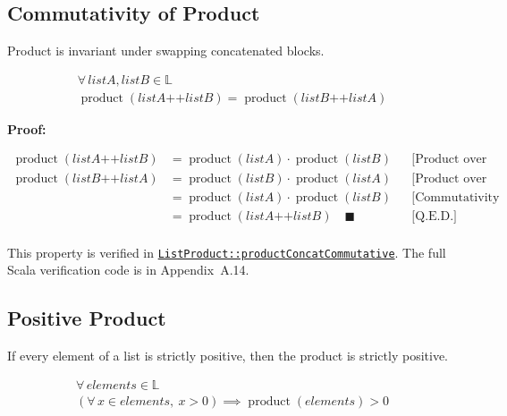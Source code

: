 \subsection{Commutativity of Product}

Product is invariant under swapping concatenated blocks.

\begin{gather*}
\forall\, listA, listB \in \mathbb{L} \\
\operatorname{product}(listA \mathbin{\texttt{++}} listB) = \operatorname{product}(listB \mathbin{\texttt{++}} listA)
\end{gather*}

\textbf{Proof:}

\begin{equation*}
\begin{aligned}
\operatorname{product}(listA \mathbin{\texttt{++}} listB) &= \operatorname{product}(listA) \cdot \operatorname{product}(listB) && \text{[Product over Concatenation]} \\
\operatorname{product}(listB \mathbin{\texttt{++}} listA) &= \operatorname{product}(listB) \cdot \operatorname{product}(listA) && \text{[Product over Concatenation]} \\
&= \operatorname{product}(listA) \cdot \operatorname{product}(listB) && \text{[Commutativity of multiplication]} \\
&= \operatorname{product}(listA \mathbin{\texttt{++}} listB) \quad \blacksquare && \text{[Q.E.D.]} \\
\end{aligned}
\end{equation*}

{\raggedright
This property is verified in
\href{https://github.com/thiagomata/prime-numbers/blob/list-article-v1.0.0/src/main/scala/v1/chapter3/list/properties/ListProduct.scala}{\texttt{ListProduct::\allowbreak productConcatCommutative}}.
The full Scala verification code is in Appendix~A.14.
\par}

\subsection{Positive Product}

If every element of a list is strictly positive, then the product is
strictly positive.

\begin{gather*}
\forall\, elements \in \mathbb{L} \\
(\forall\, x \in elements,\ x > 0) \implies \operatorname{product}(elements) > 0
\end{gather*}

